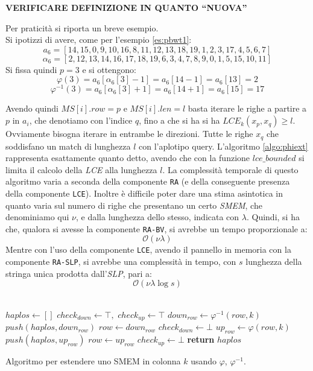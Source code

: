 \textbf{VERIFICARE DEFINIZIONE IN QUANTO ``NUOVA''}
\begin{esempio}
  Per praticità si riporta un breve esempio.\\
  Si ipotizzi di avere, come per l'esempio \ref{es:pbwt1}:
  \[a_6=[14,15,0,9,10,16,8,11,12,13,18,19,1,2,3,17,4,5,6,7]\]
  \[\alpha_6=[2,12,13,14,16,17,18,19,6,3,4,7,8,9,0,1,5,15,10,11]\]
  Si fissa quindi $p=3$ e si ottengono:
  \[\varphi(3)=a_6[\alpha_6[3]-1]=a_6[14-1]=a_6[13]=2\]
  \[\varphi^{-1}(3)=a_6[\alpha_6[3]+1]=a_6[14+1]=a_6[15]=17\]
\end{esempio}
Avendo quindi $MS[i].row=p$ e $MS[i].len=l$ basta iterare le righe a partire a
$p$ in $a_i$, che denotiamo con l'indice $q$, fino a che si ha si ha 
$LCE_k(x_p, x_q)\geq l$. Ovviamente bisogna iterare in entrambe le
direzioni. Tutte le righe $x_q$ che soddisfano un match di lunghezza $l$ con
l'aplotipo query. L'algoritmo \ref{algo:phiext} rappresenta esattamente quanto
detto, avendo che con la funzione $lce\_bounded$ si limita il calcolo della
\textit{LCE} alla lunghezza $l$. La complessità temporale di questo algoritmo
varia a seconda della componente \texttt{RA} (e della conseguente presenza della
componente \texttt{LCE}). Inoltre è difficile poter dare una stima asintotica in
quanto varia sul numero di righe che presentano un certo \textit{SMEM}, che
denominiamo qui $\nu$, e dalla lunghezza dello stesso, indicata con
$\lambda$. Quindi, si ha che, qualora si avesse la componente \texttt{RA-BV}, si
avrebbe un tempo proporzionale a:
\begin{equation}
  \label{eq:phiaccbv}
  \mathcal{O}(\nu\lambda)
\end{equation}
Mentre con l'uso della componente \texttt{LCE}, avendo il pannello in memoria
con la componente \texttt{RA-SLP}, si avrebbe una complessità in tempo, con $s$
lunghezza della stringa unica prodotta dall'\textit{SLP}, pari a:
\begin{equation}
  \label{eq:phiaccbv2}
  \mathcal{O}(\nu\lambda\log s)
\end{equation}
\\
\begin{algorithm}
  \begin{algorithmic}[1]
    \State $haplos\gets []$
    \State $check_{down}\gets \top,\,\,check_{up}\gets \top$
    \State $down_{row}\gets \varphi^{-1}(row, k)$
    \State $push(haplos, down_{row})$
    \State $row \gets down_{row}$
    \Else
    \State $check_{down}\gets \bot$
    \EndIf
    \EndWhile
    \State $up_{row}\gets \varphi(row, k)$
    \State $push(haplos, up_{row})$
    \State $row \gets up_{row}$
    \Else
    \State $check_{up}\gets \bot$
    \EndIf
    \EndWhile
    \State \textbf{return} $haplos$
    \EndFunction
  \end{algorithmic}
  \caption{Algoritmo per estendere uno SMEM in colonna $k$ usando $\varphi$,
  $\varphi^{-1}$.}
  \label{algo:phiext}
\end{algorithm}
